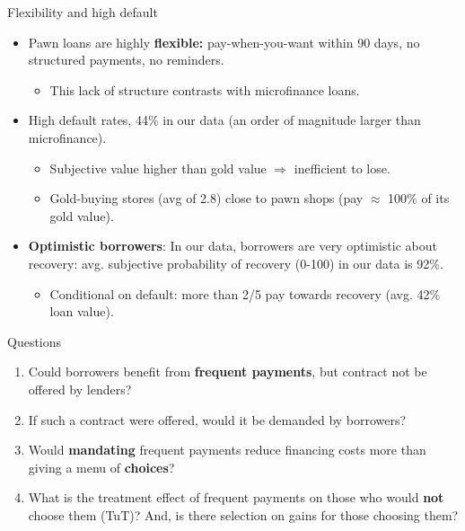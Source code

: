 \documentclass[9pt, aspectratio=169]{beamer}
\begin{document}
\begin{frame}{Flexibility and high default}
    \begin{itemize}
    \item Pawn loans are highly \textbf{flexible:} pay-when-you-want within 90 days, no structured payments, no reminders.
        \begin{itemize}
            \item This lack of structure contrasts with microfinance loans.
        \end{itemize}
    \vfill \item High default rates, 44\% in our data (an order of magnitude larger than microfinance).
    \begin{itemize}
        \item Subjective value higher than gold value $\Rightarrow$ inefficient to lose.
        \item Gold-buying stores (avg of 2.8) close to pawn shops (pay $\approx$ 100\% of its gold value).
    \end{itemize}
     \item \vfill \textbf{Optimistic borrowers}: In our data, borrowers are very optimistic about recovery: avg. subjective probability of recovery (0-100) in our data is 92\%.
     \begin{itemize}
         \item Conditional on default: more than 2/5 pay towards recovery (avg. 42\% loan value).
     \end{itemize}
\end{itemize}
\end{frame}




\begin{frame}{Questions}
     \begin{enumerate}
         \item  Could borrowers benefit from \textbf{frequent payments}, but contract not be offered by lenders?
         \item \vfill If such a contract were offered, would it be demanded by borrowers?
        \item \vfill Would \textbf{mandating} frequent payments reduce financing costs more than giving a menu of \textbf{choices}?
        \item \vfill What is the treatment effect of frequent payments on those who would \textbf{not} choose them (TuT)? And, is there selection on gains for those choosing them?
     \end{enumerate}
\end{frame}
\end{document}

